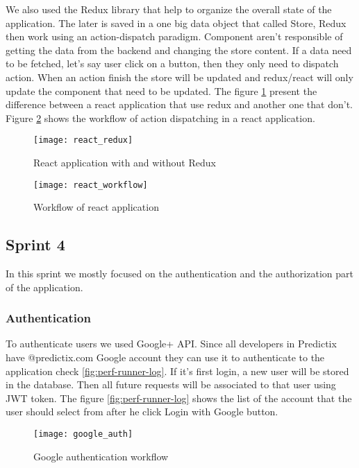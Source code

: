We also used the Redux library that help to organize the overall state of the
application. The later is  saved in a one big data object that called Store,
Redux then work using an action-dispatch paradigm. Component aren't responsible
of getting the data from the backend and changing the store content. If a data
need to be fetched, let's say user click on a button, then they only need to
dispatch action. When an action finish the store will be updated and redux/react
will only update the component that need to be updated. The
figure \hyperref[fig:react_redux]{\ref{fig:react_redux}} present the
difference between a react application that use redux and another one that
don't. Figure \hyperref[fig:react_workflow]{\ref{fig:react_workflow}} shows the
workflow of action dispatching in a react application.

\begin{figure}[h]
  \centerline{\texttt{[image: react\_redux]}}
\caption{React application with and without Redux}
\label{fig:react_redux}
\end{figure}

\begin{figure}[h]
  \centerline{\texttt{[image: react\_workflow]}}
\caption{ Workflow of react application }
\label{fig:react_workflow}
\end{figure}

\clearpage
\subsection{Sprint 4}
In this sprint we mostly focused on the authentication and the authorization part
of the application.
\subsubsection{Authentication}
To authenticate users we used Google+ API. Since all developers in Predictix
have @predictix.com Google account they can use it to authenticate to the
application check \hyperref[fig:perf-runner-log]{\ref{fig:perf-runner-log}}. If
it's first login, a new user will be stored in the database. Then all future
requests will be associated to that user using JWT token. The figure
\hyperref[fig:perf-runner-log]{\ref{fig:perf-runner-log}} shows the list of the
account that the user should select from after he click Login with Google
button.

\begin{figure}[h]
  \centerline{\texttt{[image: google\_auth]}}
\caption{Google authentication workflow}
\label{fig:google_auth}
\end{figure}

